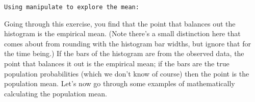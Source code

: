\documentclass[]{article}
\newenvironment{Shaded}{\begin{snugshade}}{\end{snugshade}}
\newcommand{\KeywordTok}[1]{\textcolor[rgb]{0.13,0.29,0.53}{\textbf{{#1}}}}
\newcommand{\DataTypeTok}[1]{\textcolor[rgb]{0.13,0.29,0.53}{{#1}}}
\newcommand{\DecValTok}[1]{\textcolor[rgb]{0.00,0.00,0.81}{{#1}}}
\newcommand{\FloatTok}[1]{\textcolor[rgb]{0.00,0.00,0.81}{{#1}}}
\newcommand{\StringTok}[1]{\textcolor[rgb]{0.31,0.60,0.02}{{#1}}}
\newcommand{\NormalTok}[1]{{#1}}
\begin{document}
\vspace{1pc}

\verb;Using manipulate to explore the mean:;

\begin{Shaded}
\end{Shaded}

Going through this exercise, you find that the point that balances out
the histogram is the empirical mean. (Note there's a small distinction
here that comes about from rounding with the histogram bar widths, but
ignore that for the time being.) If the bars of the histogram are from
the observed data, the point that balances it out is the empirical mean;
if the bars are the true population probabilities (which we don't know
of course) then the point is the population mean. Let's now go through
some examples of mathematically calculating the population mean.
\end{document}
